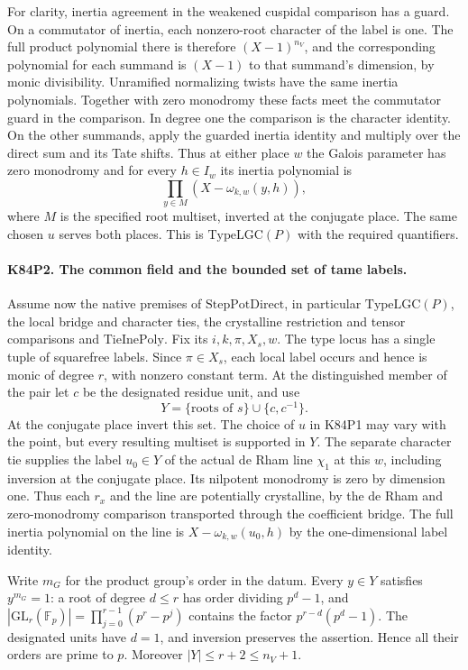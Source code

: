For clarity, inertia agreement in the weakened cuspidal comparison
has a guard. On a commutator of inertia, each nonzero-root character
of the label is one. The full product polynomial there is therefore
$(X-1)^{n_V}$, and the corresponding polynomial for each summand
is $(X-1)$ to that summand's dimension, by monic divisibility.
Unramified normalizing twists have the same inertia polynomials.
Together with zero monodromy these facts meet the commutator
guard in the comparison. In degree one the comparison is the
character identity. On the other summands, apply the guarded
inertia identity and multiply over the direct sum and its Tate
shifts. Thus at either place $w$ the Galois parameter has zero
monodromy and for every $h\in I_w$ its inertia polynomial is
\[
              \prod_{y\in M}(X-\omega_{k,w}(y,h)),
\]
where $M$ is the specified root multiset, inverted at the conjugate
place. The same chosen $u$ serves both places. This is
$\mathrm{TypeLGC}(P)$ with the required quantifiers.

\paragraph{K84P2. The common field and the bounded set of tame labels.}
Assume now the native premises of $\mathrm{StepPotDirect}$, in
particular $\mathrm{TypeLGC}(P)$, the local bridge and character
ties, the crystalline restriction and tensor comparisons and
$\mathrm{TieInePoly}$. Fix its $i,k,\pi,X_s,w$.
The type locus has a single tuple of squarefree labels. Since
$\pi\in X_s$, each local label occurs and hence is monic of
degree $r$, with nonzero constant term. At the distinguished
member of the pair let $c$ be the designated residue unit, and use
\[
           Y=\{\text{roots of }s\}\cup\{c,c^{-1}\}.
\]
At the conjugate place invert this set. The choice of $u$ in
K84P1 may vary with the point, but every resulting multiset is
supported in $Y$. The separate character tie supplies the label
$u_0\in Y$ of the actual de Rham line $\chi_1$ at this $w$,
including inversion at the conjugate place. Its nilpotent
monodromy is zero by dimension one. Thus each $r_x$ and the line
are potentially crystalline, by the de Rham and zero-monodromy
comparison transported through the coefficient bridge.
The full inertia polynomial on the line is
$X-\omega_{k,w}(u_0,h)$ by the one-dimensional label identity.

Write $m_G$ for the product group's order in the datum.
Every $y\in Y$ satisfies $y^{m_G}=1$: a root of degree
$d\le r$ has order dividing $p^d-1$, and
$|\mathrm{GL}_r(\mathbb F_p)|=\prod_{j=0}^{r-1}(p^r-p^j)$
contains the factor $p^{r-d}(p^d-1)$. The designated units have
$d=1$, and inversion preserves the assertion. Hence all their
orders are prime to $p$. Moreover $|Y|\le r+2\le n_V+1$.

